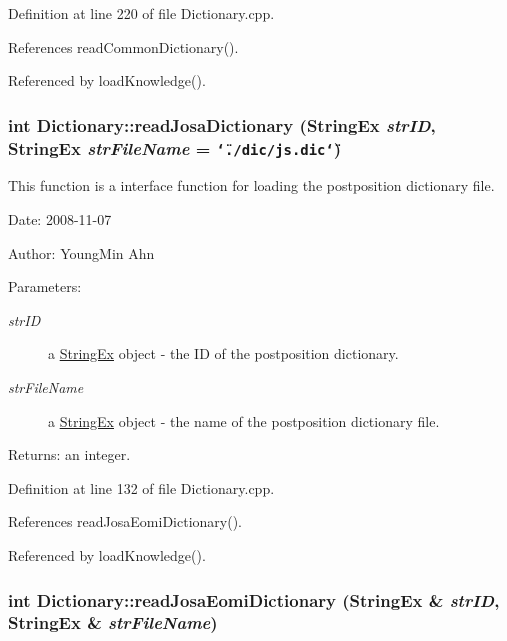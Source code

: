 Definition at line 220 of file Dictionary.cpp.

References readCommonDictionary().

Referenced by loadKnowledge().\hypertarget{classkmaOrange_1_1Dictionary_8caa9366495de16bce7c7d9923a3a0ff}{
\subsubsection[{readJosaDictionary}]{\setlength{\rightskip}{0pt plus 5cm}int Dictionary::readJosaDictionary ({\bf StringEx} {\em strID}, \/  {\bf StringEx} {\em strFileName} = {\tt \char`\"{}./dic/js.dic\char`\"{}})}}
\label{classkmaOrange_1_1Dictionary_8caa9366495de16bce7c7d9923a3a0ff}


This function is a interface function for loading the postposition dictionary file. 

\begin{Desc}
\item[Date:]2008-11-07 \end{Desc}
\begin{Desc}
\item[Author:]YoungMin Ahn \end{Desc}
\begin{Desc}
\item[Parameters:]
\begin{description}
\item[{\em strID}]a \hyperlink{classStringEx}{StringEx} object - the ID of the postposition dictionary. \item[{\em strFileName}]a \hyperlink{classStringEx}{StringEx} object - the name of the postposition dictionary file. \end{description}
\end{Desc}
\begin{Desc}
\item[Returns:]an integer. \end{Desc}


Definition at line 132 of file Dictionary.cpp.

References readJosaEomiDictionary().

Referenced by loadKnowledge().\hypertarget{classkmaOrange_1_1Dictionary_4c967c6ea71838873cae66726744a3c6}{
\subsubsection[{readJosaEomiDictionary}]{\setlength{\rightskip}{0pt plus 5cm}int Dictionary::readJosaEomiDictionary ({\bf StringEx} \& {\em strID}, \/  {\bf StringEx} \& {\em strFileName})}}
\label{classkmaOrange_1_1Dictionary_4c967c6ea71838873cae66726744a3c6}


